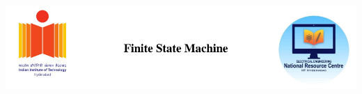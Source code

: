 \documentclass[journal,12pt,twocolumn]{IEEEtran}
\begin{document}
	
	
	\makeatletter
	\makeatother
	
	\let\StandardTheFigure\thefigure
	\let\StandardTheTable\thetable
	\renewcommand{\thetable}{\theproblem}
	
	
	\vspace{3cm}
	
	\title{
		
		\centering
		\includegraphics[width=15cm, height=4cm]{title}
		\centering
		
	}
	
	
	
	
\end{document}
